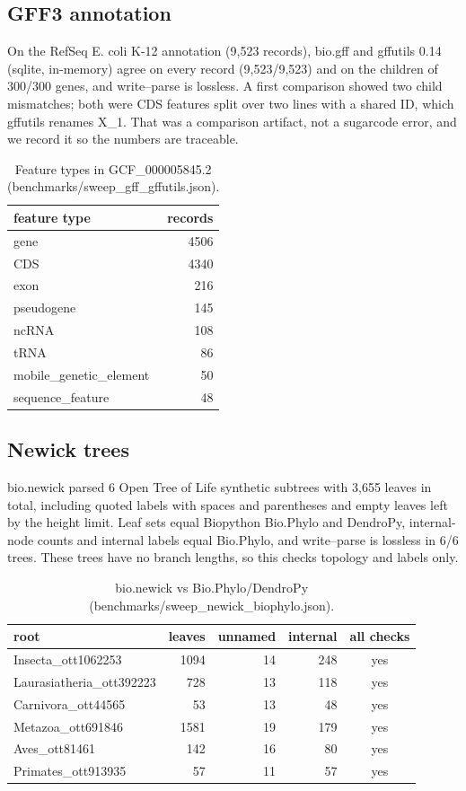 \subsection{GFF3 annotation}
On the RefSeq E. coli K-12 annotation (9,523 records), bio.gff and gffutils 0.14 (sqlite, in-memory) agree on every record (9,523/9,523) and on the children of 300/300 genes, and write--parse is lossless. A first comparison showed two child mismatches; both were CDS features split over two lines with a shared ID, which gffutils renames X\_1. That was a comparison artifact, not a sugarcode error, and we record it so the numbers are traceable.
\begin{table}[h]\centering\small\begin{tabular}{lr}\hline feature type & records\\\hline
gene & 4506\\
CDS & 4340\\
exon & 216\\
pseudogene & 145\\
ncRNA & 108\\
tRNA & 86\\
mobile\_genetic\_element & 50\\
sequence\_feature & 48\\
\hline\end{tabular}\caption{Feature types in GCF\_000005845.2 (benchmarks/sweep\_gff\_gffutils.json).}\end{table}
\subsection{Newick trees}
bio.newick parsed 6 Open Tree of Life synthetic subtrees with 3,655 leaves in total, including quoted labels with spaces and parentheses and empty leaves left by the height limit. Leaf sets equal Biopython Bio.Phylo and DendroPy, internal-node counts and internal labels equal Bio.Phylo, and write--parse is lossless in 6/6 trees. These trees have no branch lengths, so this checks topology and labels only.
\begin{table}[h]\centering\small\begin{tabular}{lrrrc}\hline root & leaves & unnamed & internal & all checks\\\hline
Insecta\_ott1062253 & 1094 & 14 & 248 & yes\\
Laurasiatheria\_ott392223 & 728 & 13 & 118 & yes\\
Carnivora\_ott44565 & 53 & 13 & 48 & yes\\
Metazoa\_ott691846 & 1581 & 19 & 179 & yes\\
Aves\_ott81461 & 142 & 16 & 80 & yes\\
Primates\_ott913935 & 57 & 11 & 57 & yes\\
\hline\end{tabular}\caption{bio.newick vs Bio.Phylo/DendroPy (benchmarks/sweep\_newick\_biophylo.json).}\end{table}
